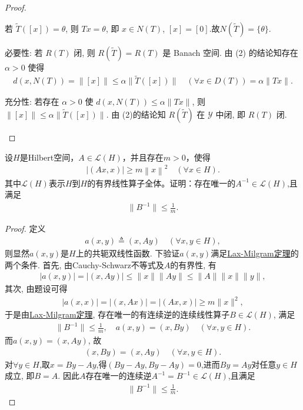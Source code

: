 \documentclass[../../main.tex]{subfiles}%
\begin{document}
\begin{proof}
\begin{enumerate}[(1)]
若 $\widetilde{T}([x])=\theta$, 则 $Tx=\theta$, 即 $x\in N(T)$, $[x]=[0]$.故$N(\widetilde{T})=\{\theta\}$.

{\heiti 必要性:} 若 $R(T)$ 闭, 则 $R(\widetilde{T})=R(T)$ 是 Banach 空间. 由 (2) 的结论知存在 $\alpha>0$ 使得
\begin{align*}
d(x,N(T))=\|[x]\|\leqslant\alpha\|\widetilde{T}([x])\|\quad(\forall x\in D(T))=\alpha\|Tx\|.
\end{align*}

{\heiti 充分性:} 若存在 $\alpha>0$ 使 $d(x,N(T))\leqslant\alpha\|Tx\|$, 则 $\|[x]\|\leqslant\alpha\|\widetilde{T}([x])\|$. 由 (2)的结论知 $R(\widetilde{T})$ 在 $\mathscr{Y}$ 中闭, 即 $R(T)$ 闭.
\end{enumerate}
\end{proof}

\begin{example}
设$H$是Hilbert空间，$A\in \mathscr{L}(H)$，并且存在$m>0$，使得
\begin{align*}
\left|\left(Ax,x\right)\right|\geqslant m\left\|x\right\|^2\quad(\forall x\in H).
\end{align*}
其中$\mathscr{L}(H)$表示$H$到$H$的有界线性算子全体。证明：存在唯一的$ A^{-1}\in \mathscr{L}(H)$,且满足
\begin{align*}
\|B^{-1}\|\leqslant \frac{1}{m}.
\end{align*}
\end{example}
\begin{proof}
定义
\begin{align*}
a(x,y) \triangleq (x,Ay) \quad (\forall x,y\in H),
\end{align*}
则显然$a(x,y)$是$H$上的共轭双线性函数.
下验证$a(x,y)$满足\hyperref[theorem:泛函分析--Lax-Milgram定理]{Lax-Milgram定理}的两个条件.
首先, 由Cauchy-Schwarz不等式及$A$的有界性, 有
\begin{align*}
|a(x,y)| = |(x,Ay)| \leqslant \|x\|\|Ay\| \leqslant \|A\|\|x\|\|y\|,
\end{align*}
其次, 由题设可得
\begin{align*}
|a(x,x)| = |(x,Ax)| = |(Ax,x)| \geqslant m\|x\|^2,
\end{align*}
于是由\hyperref[theorem:泛函分析--Lax-Milgram定理]{Lax-Milgram定理}, 存在唯一的有连续逆的连续线性算子$B\in\mathscr{L}(H)$, 满足
\begin{align*}
\|B^{-1}\|\leqslant \frac{1}{m},\quad a(x,y) = (x,By) \quad (\forall x,y\in H).
\end{align*}
而$a(x,y) = (x,Ay)$, 故
\begin{align*}
(x,By) = (x,Ay) \quad (\forall x,y\in H).
\end{align*}
对$\forall y\in H$,取$x=By-Ay$,得$(By-Ay,By-Ay)=0$,进而$By = Ay$对任意$y\in H$成立, 即$B = A$. 因此$A$存在唯一的连续逆$A^{-1} = B^{-1}\in\mathscr{L}(H)$,且满足
\begin{align*}
\|B^{-1}\|\leqslant \frac{1}{m}.
\end{align*}
\end{proof}
\end{document}
